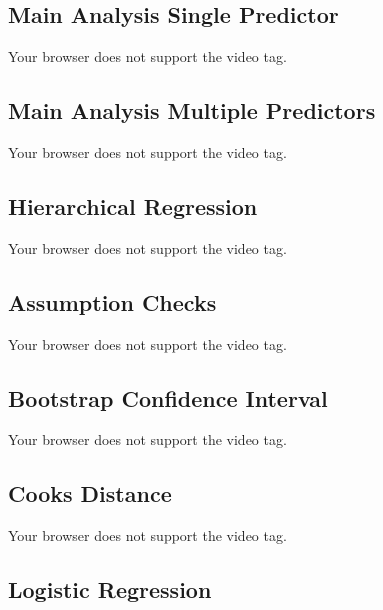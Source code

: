 \documentclass[
  letterpaper,
  DIV=11,
  numbers=noendperiod]{scrreprt}
\begin{document}
\hypertarget{main-analysis-single-predictor}{%
\subsection{Main Analysis Single
Predictor}\label{main-analysis-single-predictor}}

Your browser does not support the video tag.

\hypertarget{main-analysis-multiple-predictors}{%
\subsection{Main Analysis Multiple
Predictors}\label{main-analysis-multiple-predictors}}

Your browser does not support the video tag.

\hypertarget{hierarchical-regression}{%
\subsection{Hierarchical Regression}\label{hierarchical-regression}}

Your browser does not support the video tag.

\hypertarget{assumption-checks-3}{%
\subsection{Assumption Checks}\label{assumption-checks-3}}

Your browser does not support the video tag.

\hypertarget{bootstrap-confidence-interval}{%
\subsection{Bootstrap Confidence
Interval}\label{bootstrap-confidence-interval}}

Your browser does not support the video tag.

\hypertarget{cooks-distance}{%
\subsection{Cooks Distance}\label{cooks-distance}}

Your browser does not support the video tag.

\hypertarget{logistic-regression}{%
\subsection{Logistic Regression}\label{logistic-regression}}
\end{document}

